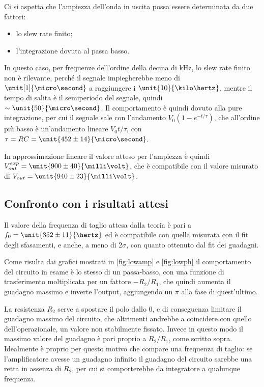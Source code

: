 \documentclass[10pt,a4paper]{article}
\begin{document}
Ci si aspetta che l'ampiezza dell'onda in uscita possa essere determinata da due fattori:
\begin{itemize}
\item lo slew rate finito;
\item l'integrazione dovuta al passa basso.
\end{itemize}

In questo caso, per frequenze dell'ordine della decina di kHz, lo slew rate finito non è rilevante, perché il segnale impiegherebbe meno di $\unit[1]{\micro\second}$ a raggiungere i  $\unit{10}{\kilo\hertz}$, mentre il tempo di salita è il semiperiodo del segnale, quindi $\sim \unit{50}{\micro\second}$. Il comportamento è quindi dovuto alla pure integrazione, per cui il segnale sale con l'andamento $V_0(1 - e^{-t/\tau})$, che all'ordine più basso è un'andamento lineare $V_0 t/\tau$, con $\tau = R C = \unit{452 \pm 14}{\micro\second}$.

In approssimazione lineare il valore atteso per l'ampiezza è quindi $V_{out}^{exp} = \unit{900 \pm 40}{\milli\volt}$, che è compatibile con il valore misurato di $V_{out} = \unit{940 \pm 23}{\milli\volt}$.


\subsection{Confronto con i risultati attesi}

Il valore della frequenza di taglio attesa dalla teoria è pari a $f_0 = \unit{352 \pm 11}{\hertz}$ ed è compatibile con quella misurata con il fit degli sfasamenti, e anche, a meno di $2\sigma$, con quanto ottenuto dal fit dei guadagni.

Come risulta dai grafici mostrati in \figurename{\ref{fig:lowamp}} e \figurename{\ref{fig:lowph}} il comportamento del circuito in esame è lo stesso di un passa-basso, con una funzione di trasferimento moltiplicata per un fattore $-R_2/R_1$, che quindi aumenta il guadagno massimo e inverte l'output, aggiungendo un $\pi$ alla fase di quest'ultimo.

La resistenza $R_2$ serve a spostare il polo dallo 0, e di conseguenza limitare il guadagno massimo del circuito, che altrimenti andrebbe a coincidere con quello dell'operazionale, un valore non stabilmente fissato. Invece in questo modo il massimo valore del guadagno è pari proprio a  $R_2/R_1$, come scritto sopra.
Idealmente è proprio per questo motivo che compare una frequenza di taglio: se l'amplificatore avesse un guadagno infinito il guadagno del circuito sarebbe una retta in assenza di $R_2$, per cui si comporterebbe da integratore a qualunque frequenza.
\end{document}
